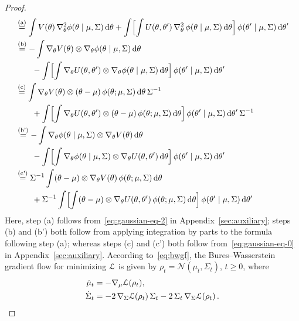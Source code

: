 \documentclass{custom}
\begin{document}
\begin{proof}
\begin{align*}
 & \overset{\text{(a)}}{=}\int V(\theta)\,\nabla_{\theta}^{2}\phi(\theta \mid \mu,\Sigma)\,\mathrm{d}\theta+\int\Bigl[\int U(\theta,\theta')\,\nabla_{\theta}^{2}\,\phi(\theta \mid \mu,\Sigma)\,\mathrm{d}\theta\Bigr]\,\phi(\theta' \mid \mu,\Sigma)\,\mathrm{d}\theta'\\
 & \overset{\text{(b)}}{=}-\int\nabla_{\theta}V(\theta)\otimes\nabla_{\theta}\phi(\theta \mid \mu,\Sigma)\,\mathrm{d}\theta \\
 &\qquad{} -\int\Bigl[\int\nabla_{\theta}U(\theta,\theta')\otimes\nabla_{\theta}\phi(\theta \mid \mu,\Sigma)\,\mathrm{d}\theta\Bigr]\,\phi(\theta' \mid \mu,\Sigma)\,\mathrm{d}\theta'\\
 & \overset{\text{(c)}}{=}\int\nabla_{\theta}V(\theta)\otimes(\theta-\mu)\,\phi(\theta;\mu,\Sigma)\,\mathrm{d}\theta\,\Sigma^{-1}\\
 &\qquad{} +\int \Bigl[\int\nabla_{\theta}U(\theta,\theta')\otimes(\theta-\mu)\,\phi(\theta;\mu,\Sigma)\,\mathrm{d}\theta\Bigr]\,\phi(\theta' \mid \mu,\Sigma)\,\mathrm{d}\theta'\,\Sigma^{-1}\\
 & \overset{\text{(b')}}{=}-\int\nabla_{\theta}\phi(\theta \mid \mu,\Sigma)\otimes\nabla_{\theta}V(\theta)\,\mathrm{d}\theta\\
 &\qquad{}-\int\Bigl[\int\nabla_{\theta}\phi(\theta \mid \mu,\Sigma)\otimes\nabla_{\theta}U(\theta,\theta')\,\mathrm{d}\theta\Bigr]\,\phi(\theta' \mid \mu,\Sigma)\,\mathrm{d}\theta'\\
 & \overset{\text{(c')}}{=}\Sigma^{-1}\int(\theta-\mu)\otimes\nabla_{\theta}V(\theta)\,\phi(\theta;\mu,\Sigma)\,\mathrm{d}\theta \\
 &\qquad{} +\Sigma^{-1}\int \Bigl[\int(\theta-\mu)\otimes\nabla_{\theta}U(\theta,\theta')\,\phi(\theta;\mu,\Sigma)\,\mathrm{d}\theta\Bigr]\,\phi(\theta' \mid \mu,\Sigma)\,\mathrm{d}\theta'
\end{align*}
Here, step (a) follows from~\eqref{eq:gaussian-eq-2} in Appendix~\ref{sec:auxiliary};
steps (b) and (b') both follow from applying integration by parts
to the formula following step (a); whereas steps (c) and (c') both
follow from~\eqref{eq:gaussian-eq-0} in Appendix~\ref{sec:auxiliary}.
According to~\eqref{eq:bwgf}, the Bures--Wasserstein
gradient flow for minimizing $\EuScript{L}$ is given by $\rho_{t}=\mathcal{N}(\mu_{t},\Sigma_{t})$, $t\ge 0$,
where 
\begin{align*}
\dot{\mu}_{t} & =-\nabla_{\mu}\loss(\rho_{t}),\\
\dot{\Sigma}_{t} & =-2\,\nabla_{\Sigma}\loss(\rho_{t})\,\Sigma_{t}-2\,\Sigma_{t}\,\nabla_{\Sigma}\loss(\rho_{t})\,.

\end{align*}
\end{proof}
\end{document}
